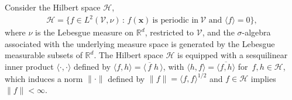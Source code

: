 \documentclass[english,12pt,jmp,graphicx]{revtex4-1}
\newcommand{\vecu}{\boldsymbol{u}}
\newcommand{\vecx}{\boldsymbol{x}}
\newcommand{\appref}[1]{Appendix~\ref{#1}}
\newcommand{\bnabla}{\mbox{\boldmath${\nabla}$}}
\newcommand{\Vc}{\mathcal{V}}
\newcommand{\Dg}{\mathfrak{D}}
\newcommand{\Hs}{\mathscr{H}}
\begin{document}







Consider the Hilbert space $\Hs$, 
%
\begin{align}\label{eq:Hilbert_Sobolev}
  \Hs=\{f\in L^2(\Vc,\nu)\,
              :\, f(\vecx)~\text{is periodic in} \ \Vc
              \text{ and } \langle f \rangle=0\},
\end{align}
%
where $\nu$ is the Lebesgue measure on $\mathbb{R}^d$, restricted
to $\Vc$, and the 
$\sigma$-algebra associated with the underlying measure space is
generated by the Lebesgue measurable subsets of $\mathbb{R}^d$.
The Hilbert space $\Hs$ is equipped with a sesquilinear inner product
$\langle\cdot,\cdot\rangle$ defined by $\langle f,h\rangle=\langle\,\overline{f}\;h\,\rangle$, with
$\langle h,f\rangle=\overline{\langle f,h\rangle}$ for $\,f,h\in\Hs$, which induces a norm $\|\cdot\|$
defined by $\|f\|=\langle f,f\rangle^{1/2}$ and $f\in\Hs$ implies
$\|f\|<\infty$.
\end{document}
